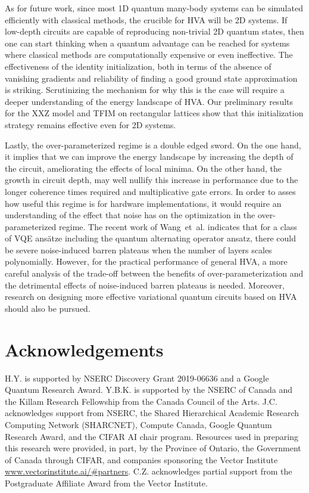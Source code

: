 \documentclass[
 aps,
 pra,
 showpacs,
 showkeys,
 superscriptaddress,
 reprint,%
twocolumn,
]{revtex4-1}
\begin{document}
As for future work, since most 1D quantum many-body systems can be simulated efficiently with classical methods, the crucible for HVA will be 2D systems. If low-depth circuits are capable of reproducing non-trivial 2D quantum states, then one can start thinking when a quantum advantage can be reached for systems where classical methods are computationally expensive or even ineffective. The effectiveness of the identity initialization, both in terms of the absence of vanishing gradients and reliability of finding a good ground state approximation is striking. Scrutinizing the mechanism for why this is the case will require a deeper understanding of the energy landscape of HVA. Our preliminary results for the XXZ model and TFIM on rectangular lattices show that this initialization strategy remains effective even for 2D systems.

Lastly, the over-parameterized regime is a double edged sword. On the one hand, it implies that we can improve the energy landscape by increasing the depth of the circuit, ameliorating the effects of local minima. On the other hand, the growth in circuit depth, may well nullify this increase in performance due to the longer coherence times required and multiplicative gate errors. In order to asses how useful this regime is for hardware implementations, it would require an understanding of the effect that noise has on the optimization in the over-parameterized regime. The recent work \cite{wang2020noiseinduced} of Wang~et~al. indicates that for a class of VQE ans\"atze including the quantum alternating operator ansatz, there could be severe noise-induced barren plateaus when the number of layers scales polynomially. However, for the practical performance of general HVA, a more careful analysis of the trade-off between the benefits of over-parameterization and the detrimental effects of noise-induced barren plateaus is needed. Moreover, research on designing more effective variational quantum circuits based on HVA should also be pursued.



\section{Acknowledgements}
H.Y. is supported by NSERC Discovery Grant 2019-06636 and a Google Quantum Research Award. Y.B.K. is supported by the NSERC of Canada and the Killam Research Fellowship from the Canada Council of the Arts. J.C. acknowledges support from NSERC, the Shared Hierarchical Academic Research Computing Network (SHARCNET), Compute Canada, Google Quantum Research Award, and the CIFAR AI chair program. Resources used in preparing this research were provided, in part, by the Province of Ontario, the Government of Canada through CIFAR, and companies sponsoring the Vector Institute \url{www.vectorinstitute.ai/#partners}. C.Z. acknowledges partial support from the Postgraduate Affiliate Award from the Vector Institute. 
\end{document}
